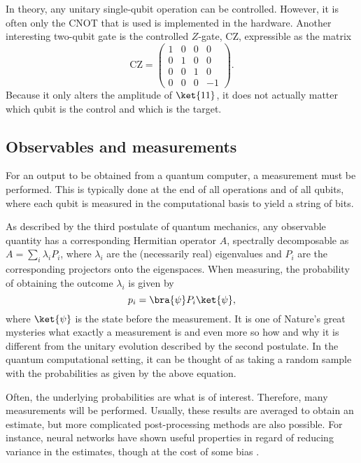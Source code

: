In theory, any unitary single-qubit operation can be controlled.
However, it is often only the CNOT that is used is implemented in the hardware.
Another interesting two-qubit gate is the controlled $Z$-gate, CZ, expressible as the matrix
\begin{equation}
    \text{CZ} = \begin{pmatrix} 1 & 0 & 0 & 0 \\ 0 & 1 & 0 & 0 \\ 0 & 0 & 1 & 0 \\ 0 & 0 & 0 & -1 \end{pmatrix}.
\end{equation}
Because it only alters the amplitude of $\ket{11}$, it does not actually matter which qubit is the control and which is the target.

\subsection{Observables and measurements}
For an output to be obtained from a quantum computer, a measurement must be performed.
This is typically done at the end of all operations and of all qubits, where each qubit is measured in the computational basis to yield a string of bits.

As described by the third postulate of quantum mechanics, any observable quantity has a corresponding Hermitian operator $A$, spectrally decomposable as $A = \sum_{i} \lambda_i P_i$, where $\lambda_i$ are the (necessarily real) eigenvalues and $P_i$ are the corresponding projectors onto the eigenspaces.
When measuring, the probability of obtaining the outcome $\lambda_i$ is given by
\begin{equation}
    p_i = \bra{\psi} P_i \ket{\psi},
\end{equation}
where $\ket{\psi}$ is the state before the measurement.
It is one of Nature's great mysteries what exactly a measurement is and even more so how and why it is different from the unitary evolution described by the second postulate.
In the quantum computational setting, it can be thought of as taking a random sample with the probabilities as given by the above equation.

Often, the underlying probabilities are what is of interest.
Therefore, many measurements will be performed.
Usually, these results are averaged to obtain an estimate, but more complicated post-processing methods are also possible.
For instance, neural networks have shown useful properties in regard of reducing variance in the estimates, though at the cost of some bias \cite{torlai2020}.

